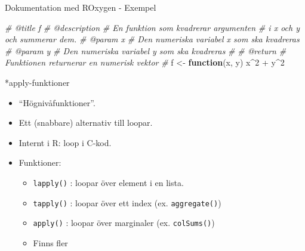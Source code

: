 \documentclass[
  11pt,
  ignorenonframetext,
]{beamer}
\newenvironment{Shaded}{\begin{snugshade}}{\end{snugshade}}
\newcommand{\CommentTok}[1]{\textcolor[rgb]{0.56,0.35,0.01}{\textit{#1}}}
\newcommand{\ControlFlowTok}[1]{\textcolor[rgb]{0.13,0.29,0.53}{\textbf{#1}}}
\newcommand{\DecValTok}[1]{\textcolor[rgb]{0.00,0.00,0.81}{#1}}
\newcommand{\NormalTok}[1]{#1}
\newcommand{\OtherTok}[1]{\textcolor[rgb]{0.56,0.35,0.01}{#1}}
\newcommand{\SpecialCharTok}[1]{\textcolor[rgb]{0.00,0.00,0.00}{#1}}
\providecommand{\tightlist}{%
  \setlength{\itemsep}{0pt}\setlength{\parskip}{0pt}}
\begin{document}
\begin{frame}[fragile]{Dokumentation med ROxygen - Exempel}
\protect\hypertarget{dokumentation-med-roxygen---exempel}{}
\begin{Shaded}
\begin{Highlighting}[]
\CommentTok{\#\textquotesingle{} @title f}
\CommentTok{\#\textquotesingle{} @description}
\CommentTok{\#\textquotesingle{} En funktion som kvadrerar argumenten }
\CommentTok{\#\textquotesingle{} i x och y och summerar dem. }
\CommentTok{\#\textquotesingle{} @param x}
\CommentTok{\#\textquotesingle{} Den numeriska variabel x som ska kvadreras}
\CommentTok{\#\textquotesingle{} @param y}
\CommentTok{\#\textquotesingle{} Den numeriska variabel y som ska kvadreras}
\CommentTok{\#\textquotesingle{}}
\CommentTok{\#\textquotesingle{} @return}
\CommentTok{\#\textquotesingle{} Funktionen returnerar en numerisk vektor}
\CommentTok{\#\textquotesingle{}}
\NormalTok{f }\OtherTok{\textless{}{-}} \ControlFlowTok{function}\NormalTok{(x, y) x}\SpecialCharTok{\^{}}\DecValTok{2} \SpecialCharTok{+}\NormalTok{ y}\SpecialCharTok{\^{}}\DecValTok{2}
\end{Highlighting}
\end{Shaded}
\end{frame}

\begin{frame}{*apply-funktioner}
\protect\hypertarget{apply-funktioner}{}
\begin{itemize}
\tightlist
\item
  ``Högnivåfunktioner''.
\item
  Ett (snabbare) alternativ till loopar.
\item
  Internt i R: loop i C-kod.
\item
  Funktioner:

  \begin{itemize}
  \tightlist
  \item
    \texttt{lapply()} : loopar över element i en lista.
  \item
    \texttt{tapply()} : loopar över ett index (ex. \texttt{aggregate()})
  \item
    \texttt{apply()} : loopar över marginaler (ex. \texttt{colSums()})
  \item
    Finns fler
  \end{itemize}
\end{itemize}
\end{frame}
\end{document}
